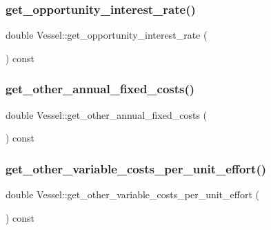 \mbox{\label{class_vessel_a419c10cf8afe61e1b4ded113a2610f74}} 
\subsubsection{\texorpdfstring{get\_opportunity\_interest\_rate()}{get\_opportunity\_interest\_rate()}}
{\footnotesize\ttfamily double Vessel\+::get\+\_\+opportunity\+\_\+interest\+\_\+rate (\begin{DoxyParamCaption}{ }\end{DoxyParamCaption}) const}

\mbox{\label{class_vessel_a05b037004261068ae11b8b2f63bdc7cd}} 
\subsubsection{\texorpdfstring{get\_other\_annual\_fixed\_costs()}{get\_other\_annual\_fixed\_costs()}}
{\footnotesize\ttfamily double Vessel\+::get\+\_\+other\+\_\+annual\+\_\+fixed\+\_\+costs (\begin{DoxyParamCaption}{ }\end{DoxyParamCaption}) const}

\mbox{\label{class_vessel_af61389115906517d22f799c7d3d2033e}} 
\subsubsection{\texorpdfstring{get\_other\_variable\_costs\_per\_unit\_effort()}{get\_other\_variable\_costs\_per\_unit\_effort()}}
{\footnotesize\ttfamily double Vessel\+::get\+\_\+other\+\_\+variable\+\_\+costs\+\_\+per\+\_\+unit\+\_\+effort (\begin{DoxyParamCaption}{ }\end{DoxyParamCaption}) const}

